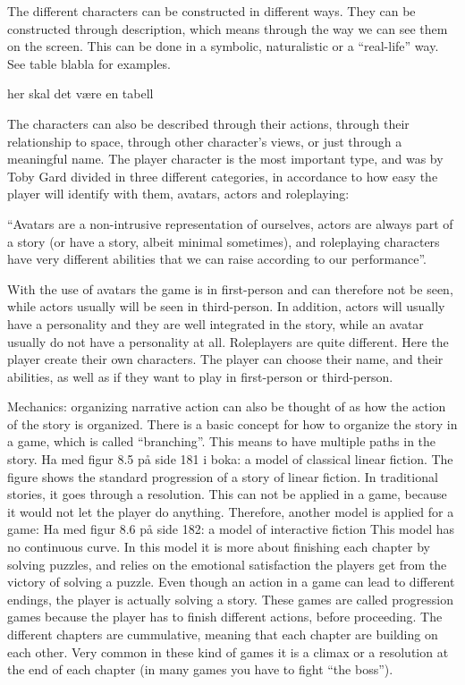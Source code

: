 The different characters can be constructed in different ways. They can be constructed through description, which means through the way we can see them on the screen. This can be done in a symbolic, naturalistic or a “real-life” way. See table blabla for examples.

her skal det være en tabell

The characters can also be described through their actions, through their relationship to space, through other character’s views, or just through a meaningful name. The player character is the most important type, and was by Toby Gard divided in three different categories, in accordance to how easy the player will identify with them, avatars, actors and roleplaying: 

“Avatars are a non-intrusive representation of ourselves, actors are always part of a story (or have a story, albeit minimal sometimes), and roleplaying characters have very different abilities that we can raise according to our performance”. \cite{understandingvg} 

With the use of avatars the game is in first-person and can therefore not be seen, while actors usually will be seen in third-person. In addition, actors will usually have a personality and they are well integrated in the story, while an avatar usually do not have a personality at all. Roleplayers are quite different. Here the player create their own characters. The player can choose their name, and their abilities, as well as if they want to play in first-person or third-person.  

Mechanics: organizing narrative action can also be thought of as how the action of the story is organized. There is a basic concept for how to organize the story in a game, which is called “branching”. This means to have multiple paths in the story. 
Ha med figur 8.5 på side 181 i boka: a model of classical linear fiction. 
The figure shows the standard progression of a story of linear fiction. In traditional stories, it goes through a resolution. This can not be applied in a game, because it would not let the player do anything. Therefore, another model is applied for a game:
Ha med figur 8.6 på side 182: a model of interactive fiction
This model has no continuous curve. In this model it is more about finishing each chapter by solving puzzles, and relies on the emotional satisfaction the players get from the victory of solving a puzzle. Even though an action in a game can lead to different endings, the player is actually solving a story. These games are called progression games because the player has to finish different actions, before proceeding. The different chapters are cummulative, meaning that each chapter are building on each other. Very common in these kind of games it is a climax or a resolution at the end of each chapter (in many games you have to fight “the boss”). 

